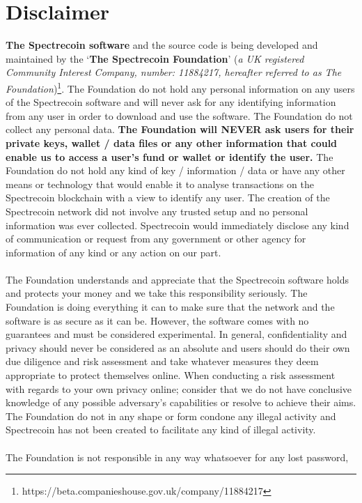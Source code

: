 \section{Disclaimer}
\textbf{The Spectrecoin software} and the source code is being developed 
and maintained by the ‘\textbf{The Spectrecoin Foundation}’
(\textit{a UK registered Community Interest Company, number: 11884217, hereafter
referred to as The Foundation})\footnote{https://beta.companieshouse.gov.uk/company/11884217}.
The Foundation do not hold any personal information on any users of the
Spectrecoin software and will never ask for any identifying information
from any user in order to download and use the software. The Foundation
do not collect any personal data. \textbf{The Foundation will NEVER ask
users for their private keys, wallet / data files or any other information 
that could enable us to access a user’s fund or wallet or identify the
user.} The Foundation do not hold any kind of key / information / data
or have any other means or technology that would enable it to analyse
transactions on the Spectrecoin blockchain with a view to identify any
user. The creation of the Spectrecoin network did not involve any trusted
setup and no personal information was ever collected. Spectrecoin would
immediately disclose any kind of communication or request from any
government or other agency for information of any kind or any action on
our part.
\\
\\
The Foundation understands and appreciate that the Spectrecoin software 
holds and protects your money and we take this responsibility seriously. The
Foundation is doing everything it can to make sure that the network and
the software is as secure as it can be. However, the software comes with
no guarantees and must be considered experimental. In general, confidentiality
and privacy should never be considered as an absolute and users should do their
own due diligence and risk assessment and take whatever measures they deem
appropriate to protect themselves online. When conducting a risk assessment
with regards to your own privacy online; consider that we do not have
conclusive knowledge of any possible adversary’s capabilities or resolve to
achieve their aims. The Foundation do not in any shape or form condone any
illegal activity and Spectrecoin has not been created to facilitate any kind
of illegal activity.
\\
\\
The Foundation is not responsible in any way whatsoever for any lost password,
